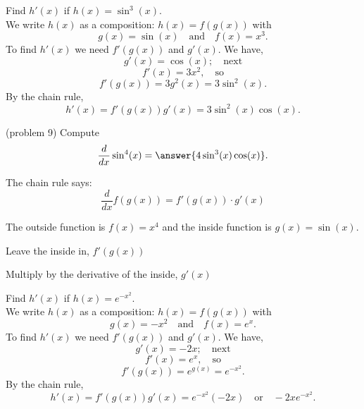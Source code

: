 \documentclass{ximera}
\begin{document}
\begin{example}[example 9]
Find $h'(x)$ if $h(x) = \sin^3(x)$.\\
We write $h(x)$ as a composition: $h(x)=f(g(x))$ with 
\[g(x) =\sin(x)   \quad \text{and} \quad  f(x) = x^3.\]
 To find $h'(x)$ we need $f'(g(x))$ and $g'(x)$.  We have, 
\[g'(x) =\cos(x); \quad \text{next} \] 
\[f'(x) = 3x^2, \quad \text{so}\] 
\[f'(g(x)) = 3g^2(x) = 3\sin^2(x).\]
By the chain rule,
\[h'(x) = f'(g(x))g'(x) =  3\sin^2(x)\cos(x).\]
\end{example}

\begin{center}
\begin{foldable}
\end{foldable}
\end{center}
 


\begin{problem}(problem 9)
  Compute
  \[
  \frac{d}{dx} \sin^4(x) = \answer{4\sin^3(x)\cos(x)}.
  \]
  
    \begin{hint}
      The chain rule says:
      \[
      \frac{d}{dx} f(g(x)) = f'(g(x))\cdot g'(x)
      \]
    \end{hint}
    \begin{hint}
      The outside function is $f(x) = x^4$ and the inside
      function is $g(x) = \sin(x)$.
    \end{hint}
    \begin{hint}
		  Leave the inside in, $f'(g(x))$
		\end{hint}
		\begin{hint}
		  Multiply by the derivative of the inside, $g'(x)$
		\end{hint}
    
\end{problem}



\begin{example}[example 10]
Find $h'(x)$ if $h(x) = e^{-x^2}$.\\
We write $h(x)$ as a composition: $h(x)=f(g(x))$ with 
\[g(x) = -x^2  \quad \text{and} \quad  f(x) =e^x.\]
 To find $h'(x)$ we need $f'(g(x))$ and $g'(x)$. We have, 
\[g'(x) = -2x; \quad \text{next} \] 
\[f'(x) = e^x, \quad \text{so} \]
\[f'(g(x)) = e^{g(x)} = e^{-x^2}.\]
By the chain rule,
\[h'(x) = f'(g(x))g'(x) = e^{-x^2} (-2x) \quad \text{or} \quad -2xe^{-x^2}.\]
\end{example}
\end{document}
